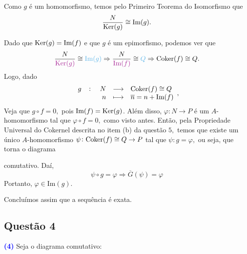 \documentclass[11pt,a4paper]{article}
\newcommand{\questao}[1]{\subsection{Questão #1} \textcolor{blue}{\bf(#1)}}
\begin{document}
\begin{itemize}
\begin{itemize}
        Como $g$ é um homomorfismo, temos pelo Primeiro Teorema do Isomorfismo que
        \[
        \frac{N}{{\rm Ker}(g)} \cong \mbox{Im}(g).
        \]
        
        Dado que ${\rm Ker}(g) = \mbox{Im}(f)$ e que $g$ é um epimorfismo, podemos ver que
            \[
        \frac{N}{\textcolor{Mulberry}{\Ker(g)}} \cong \textcolor{CornflowerBlue}{\mbox{Im}(g)} \Rightarrow  \frac{N}{\textcolor{Mulberry}{\mbox{Im}(f)}} \cong \textcolor{CornflowerBlue}{Q} \Rightarrow \Coker(f) \cong Q.
        \]
        Logo, dado
        \[
        \fullfunction{g}{N}{\Coker(f) \cong Q}{n}{\overline{n} = n + \mbox{Im}(f)},
        \]
Veja que $g \circ f = 0,$ pois $\mbox{Im}(f) = {\rm Ker}(g)$. Além disso, $\varphi \colon N \to P$ é um $A$-homomorfismo tal que $\varphi \circ f = 0,$ como visto antes. Então, pela Propriedade Universal do Cokernel descrita no item (b) da questão $5,$ temos que existe um único $A$-homomorfismo $\psi \colon {\rm Coker}(f) \cong Q \to P$ tal que $\psi \colon g = \varphi,$ ou seja, que torna o diagrama
\begin{center}
\end{center}



comutativo. Daí,
\[
\psi \circ g = \varphi \Rightarrow \boxed{\overline{G}(\psi) = \varphi}
\]
Portanto, $\varphi \in \mbox{Im}(g).$


    \end{itemize}
    
    Concluímos assim que a sequência é exata.
\end{itemize}


\questao{4} Seja o diagrama comutativo:
\begin{center}
\end{center}
\end{document}
